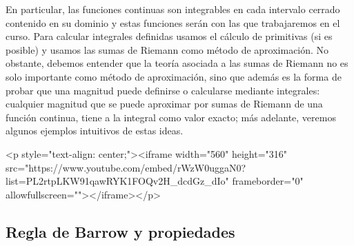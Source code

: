
En particular, las funciones continuas son integrables en cada intervalo cerrado contenido en su dominio y estas funciones serán con las que trabajaremos en el curso.
Para calcular integrales definidas usamos el cálculo de primitivas (si es posible) y usamos las sumas de Riemann como método de aproximación.
No obstante, debemos entender que la teoría asociada a las sumas de Riemann no es solo importante como método de aproximación, sino que además es la forma de probar que una magnitud puede definirse o calcularse mediante integrales: cualquier magnitud que se puede aproximar por sumas de Riemann de una función continua, tiene a la integral como valor exacto; más adelante, veremos algunos ejemplos intuitivos de estas ideas.

\begin{rawhtml}
<p style="text-align: center;"><iframe width="560" height="316" src="https://www.youtube.com/embed/rWzW0uggaN0?list=PL2rtpLKW91qawRYK1FOQv2H_dcdGz_dIo" frameborder="0" allowfullscreen=""></iframe></p>
\end{rawhtml}


\subsection{Regla de Barrow y propiedades}

